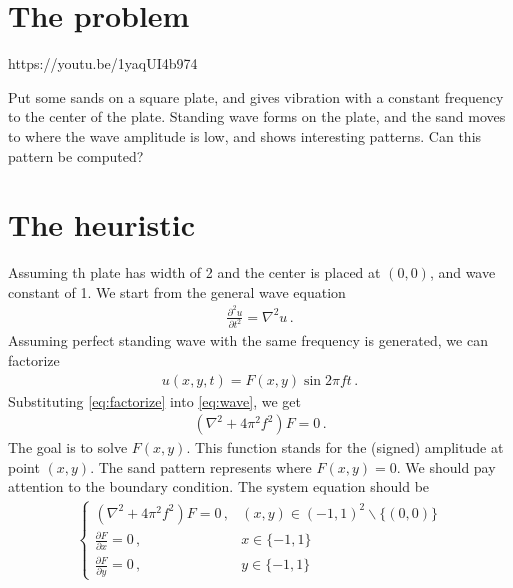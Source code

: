\documentclass[]{article}
\begin{document}
\section{The problem}
https://youtu.be/1yaqUI4b974

Put some sands on a square plate, and gives vibration with a constant frequency to the center of the plate. Standing wave forms on the plate, and the sand moves to where the wave amplitude is low, and shows interesting patterns. Can this pattern be computed?

\section{The heuristic}
Assuming th plate has width of 2 and the center is placed at $(0, 0)$, and wave constant of 1. We start from the general wave equation
\begin{align}
\frac{\partial^2 u}{\partial t^2} = \nabla^2 u\,. \label{eq:wave}
\end{align}
Assuming perfect standing wave with the same frequency is generated, we can factorize
\begin{align}
u(x,y,t) = F(x,y)\sin 2\pi ft\,.\label{eq:factorize}
\end{align}
Substituting \eqref{eq:factorize} into \eqref{eq:wave}, we get
\begin{align}
(\nabla^2 + 4\pi^2 f^2) F = 0\,.\label{eq:core}
\end{align}
The goal is to solve $F(x, y)$. This function stands for the (signed) amplitude at point $(x, y)$. The sand pattern represents where $F(x, y) = 0$.
We should pay attention to the boundary condition. The system equation should be
\begin{align}
\begin{cases}(\nabla^2 + 4\pi^2 f^2) F = 0\,, & (x, y) \in (-1, 1)^2 \backslash \{(0, 0)\}\\
\frac{\partial F}{\partial x} = 0\,, & x \in \{-1, 1\}\\
\frac{\partial F}{\partial y} = 0\,, & y \in \{-1, 1\}
\end{cases}
\end{align}
\end{document}
